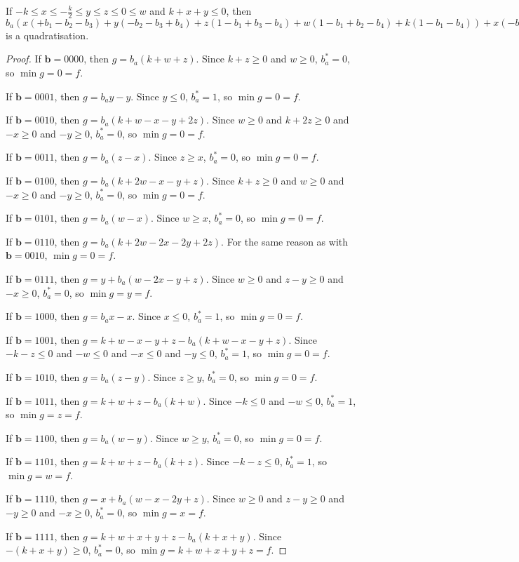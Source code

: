\documentclass[11pt]{scrartcl}
\newcommand{\vc}[1]{\boldsymbol{#1}}
\begin{document}
\begin{lemma}
	If $-k\le x \le -\frac{k}{2} \le y \le z \le 0 \le w$ and $k + x+ y \le 0$, then $b_a(x(+b_1-b_2-b_3)+y(-b_2-b_3+b_4)+z(1-b_1+b_3-b_4)+w(1-b_1+b_2-b_4)+k(1-b_1-b_4))+x(-b_1+b_1b_2+b_1b_3)+y(-b_4+b_2b_4+b_3b_4)+z(+b_1b_4)+w(+b_1b_4)+k(+b_1b_4)$ is a quadratisation.\\
 \end{lemma}

\begin{proof}
If $\vc b = 0000$, then $g = b_a(k + w + z)$.
Since $k + z \ge 0 $ and $w \ge 0$, $b_a^* = 0$, so $\min g = 0 = f$.

If $\vc b = 0001$, then $g = b_ay - y$.
Since $y \le 0$, $b_a^* = 1$, so $\min g = 0 = f$.

If $\vc b = 0010$, then $g = b_a(k + w - x - y + 2z)$.
Since $w \ge 0 $ and $k + 2z \ge 0$ and $-x \ge 0$ and $-y \ge 0$, $b_a^* = 0$, so $\min g = 0 = f$.

If $\vc b = 0011$, then $g = b_a(z - x)$.
Since $z \ge x$, $b_a^* = 0$, so $\min g = 0 = f$.

If $\vc b = 0100$, then $g = b_a(k + 2w - x - y + z)$.
Since $k + z \ge 0$ and $w \ge 0$ and $-x \ge 0$ and $-y \ge 0$, $b_a^* = 0 $, so $\min g = 0 = f$.

If $\vc b = 0101$, then $g = b_a(w - x)$.
Since $w \ge x$, $b_a^* = 0$, so $\min g = 0 = f$.

If $\vc b = 0110$, then $g = b_a(k + 2w - 2x - 2y + 2z)$.
For the same reason as with $\vc b = 0010$, $\min g = 0 = f$.

If $\vc b = 0111$, then $g = y + b_a(w - 2x - y + z)$.
Since $w \ge 0$ and $z-y \ge 0$ and $-x \ge 0$, $b_a^* = 0$, so $\min g = y = f$.

If $\vc b = 1000$, then $g = b_ax - x$.
Since $x \le 0$, $b_a^* = 1$, so $\min g = 0 = f$.

If $\vc b = 1001$, then $g = k + w - x - y + z - b_a(k + w - x - y + z)$.
Since $-k - z \le 0$ and $-w \le 0$ and $-x \le 0 $ and $-y \le 0$, $b_a^* = 1$, so $\min g = 0 = f$.

If $\vc b = 1010$, then $g = b_a(z - y)$.
Since $z \ge y$, $b_a^* = 0$, so $\min g = 0 = f$.

If $\vc b = 1011$, then $g = k + w + z - b_a(k + w)$.
Since $-k \le 0$ and $-w \le 0$, $b_a^* = 1$, so $\min g = z = f$.

If $\vc b = 1100$, then $g = b_a(w - y)$.
Since $w \ge y$, $b_a^* = 0$, so $\min g = 0 = f$.

If $\vc b = 1101$, then $g = k + w + z - b_a(k + z)$.
Since $-k - z \le 0$, $b_a^* = 1$, so $\min g = w = f$.

If $\vc b = 1110$, then $g = x + b_a(w - x - 2y + z)$.
Since $w \ge 0$ and $z - y \ge 0$ and $-y \ge 0$ and $-x \ge 0$, $b_a^* = 0$, so $\min g = x = f$.

If $\vc b = 1111$, then $g = k + w + x + y + z - b_a(k + x + y)$.
Since $-(k + x + y) \ge 0$, $b_a^* = 0$, so $\min g = k + w + x + y + z = f$. 

\end{proof}
\end{document}
